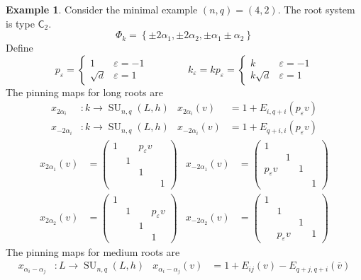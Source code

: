 \documentclass[12pt]{article}
\theoremstyle{definition}
\newtheorem{example}[theorem]{Example}
\newcommand{\eps}{\varepsilon}
\newcommand{\lb}{\left\{}
\newcommand{\rb}{\right\}}
\newcommand{\ov}{\overline}
\DeclareMathOperator{\SU}{SU}
\begin{document}
\begin{example}
Consider the minimal example $(n,q) = (4,2)$. The root system is type $\mathsf{C}_2$.
\[
	\Phi_k = \lb \pm 2\alpha_1, \pm 2 \alpha_2, \pm \alpha_1 \pm \alpha_2 \rb
\]
Define
\[
	p_\eps =
	\begin{cases}
		1 & \eps = -1 \\
		\sqrt{d} & \eps = 1
	\end{cases}
	\qquad \qquad
	k_\eps = k p_\eps = 
	\begin{cases}
		k & \eps = -1 \\
		k \sqrt{d} & \eps = 1
	\end{cases} 
\]
The pinning maps for long roots are 
\begin{align*}
	x_{2\alpha_i}&: k \to \SU_{n,q}(L,h) & x_{2\alpha_i}(v) &=  1 + E_{i,q+i}(p_\eps v) \\
	x_{-2\alpha_i}&: k \to \SU_{n,q}(L,h) & x_{-2\alpha_i}(v) &= 1 + E_{q+i,i}(p_\eps v)
\end{align*}
\begin{align*}
	x_{2\alpha_1}(v) &=
	\begin{pmatrix}
		1 && p_\eps v \\
		& 1 \\
		&& 1 \\
		&&& 1
	\end{pmatrix} &
	x_{-2\alpha_1}(v) &=
	\begin{pmatrix}
		1 \\
		& 1 \\
		p_\eps v && 1 \\
		&&& 1
	\end{pmatrix} \\[2ex]
	x_{2\alpha_2}(v) &=
	\begin{pmatrix}
		1 \\
		& 1 && p_\eps v \\
		&& 1 \\
		&&& 1
	\end{pmatrix} &
	x_{-2\alpha_2}(v) &=
	\begin{pmatrix}
		1 \\
		& 1 \\
		&& 1 \\
		& p_\eps v && 1
	\end{pmatrix}
\end{align*}
The pinning maps for medium roots are
\begin{align*}
	x_{\alpha_i - \alpha_j}&:L \to \SU_{n,q}(L,h) & x_{\alpha_i - \alpha_j}(v) &= 1 + E_{ij}(v) - E_{q+j,q+i}(\ov v) \\

\end{align*}
\end{example}
\end{document}
